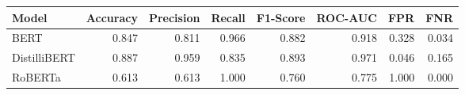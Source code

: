 \begin{tabular}{|l||r|r|r|r|r|r|r|}
\toprule
Model & \textbf{Accuracy} & \textbf{Precision} & Recall & \textbf{F1-Score} & \textbf{ROC-AUC} & \textbf{FPR} & FNR \\
\midrule \midrule
BERT & 0.847 & 0.811 & 0.966 & 0.882 & 0.918 & 0.328 & 0.034 \\
DistilliBERT & 0.887 & 0.959 & 0.835 & 0.893 & 0.971 & 0.046 & 0.165 \\
RoBERTa & 0.613 & 0.613 & 1.000 & 0.760 & 0.775 & 1.000 & 0.000 \\
\bottomrule
\end{tabular}
